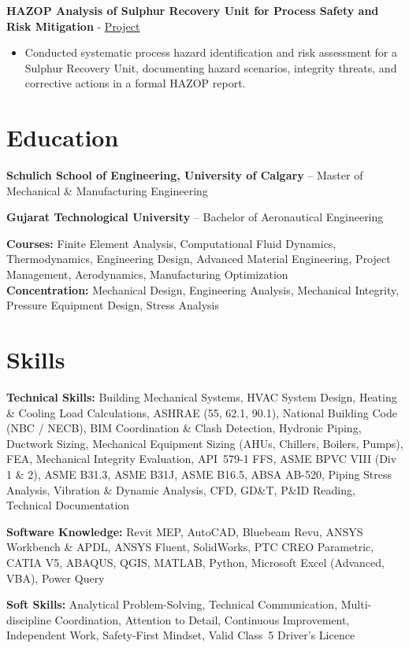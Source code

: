 \documentclass[10pt, letterpaper]{article}
\newcommand{\projheadlink}[3]{\vspace{5pt}\textbf{#1} - \href{#3}{\textcolor{linkblue}{\underline{#2}}}\par\vspace{1pt}}
\newcommand{\skillrow}[2]{\vspace{2pt}\textbf{#1: }#2\par}
\newcommand{\edurow}[2]{\vspace{3pt}\textbf{#1} {--} #2\par}
\begin{document}
\projheadlink{HAZOP Analysis of Sulphur Recovery Unit for Process Safety and Risk Mitigation}{Project}{https://www.linkedin.com/posts/jaykumar-prajapati_processsafety-hazop-projectmanagement-activity-7324636037656326144-dBnA}
\begin{itemize}
  \item Conducted systematic process hazard identification and risk assessment for a Sulphur Recovery Unit, documenting hazard scenarios, integrity threats, and corrective actions in a formal HAZOP report.
\end{itemize}

\section*{Education}

\edurow{Schulich School of Engineering, University of Calgary}{Master of Mechanical \& Manufacturing Engineering}
\edurow{Gujarat Technological University}{Bachelor of Aeronautical Engineering}

{\small\color{black}\textbf{Courses:} Finite Element Analysis, Computational Fluid Dynamics, Thermodynamics, Engineering Design, Advanced Material Engineering, Project Management, Aerodynamics, Manufacturing Optimization}\\[2pt]
{\small\color{black}\textbf{Concentration:} Mechanical Design, Engineering Analysis, Mechanical Integrity, Pressure Equipment Design, Stress Analysis}

\section*{Skills}

\skillrow{Technical Skills}{Building Mechanical Systems, HVAC System Design, Heating \& Cooling Load Calculations, ASHRAE (55, 62.1, 90.1), National Building Code (NBC / NECB), BIM Coordination \& Clash Detection, Hydronic Piping, Ductwork Sizing, Mechanical Equipment Sizing (AHUs, Chillers, Boilers, Pumps), FEA, Mechanical Integrity Evaluation, API~579-1 FFS, ASME BPVC VIII (Div 1 \& 2), ASME B31.3, ASME B31J, ASME B16.5, ABSA AB-520, Piping Stress Analysis, Vibration \& Dynamic Analysis, CFD, GD\&T, P\&ID Reading, Technical Documentation}

\skillrow{Software Knowledge}{Revit MEP, AutoCAD, Bluebeam Revu, ANSYS Workbench \& APDL, ANSYS Fluent, SolidWorks, PTC CREO Parametric, CATIA V5, ABAQUS, QGIS, MATLAB, Python, Microsoft Excel (Advanced, VBA), Power Query}

\skillrow{Soft Skills}{Analytical Problem-Solving, Technical Communication, Multi-discipline Coordination, Attention to Detail, Continuous Improvement, Independent Work, Safety-First Mindset, Valid Class~5 Driver's Licence}
\end{document}
